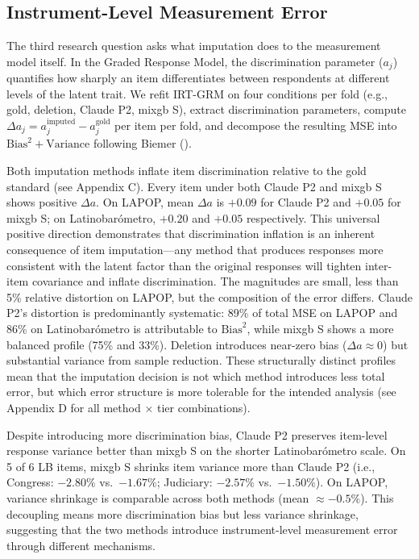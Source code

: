 \documentclass[
  man,
  floatsintext,
  longtable,
  nolmodern,
  notxfonts,
  notimes,
  colorlinks=true,linkcolor=blue,citecolor=blue,urlcolor=blue]{apa7}
\begin{document}
\subsection{Instrument-Level Measurement
Error}\label{instrument-level-measurement-error}

The third research question asks what imputation does to the measurement
model itself. In the Graded Response Model, the discrimination parameter
(\(a_j\)) quantifies how sharply an item differentiates between
respondents at different levels of the latent trait. We refit IRT-GRM on
four conditions per fold (e.g., gold, deletion, Claude P2, mixgb S),
extract discrimination parameters, compute
\(\Delta a_j = a_j^{\text{imputed}} - a_j^{\text{gold}}\) per item per
fold, and decompose the resulting MSE into
\(\text{Bias}^2 + \text{Variance}\) following Biemer
().

Both imputation methods inflate item discrimination relative to the gold
standard (see Appendix C). Every item under both Claude P2 and mixgb S
shows positive \(\Delta a\). On LAPOP, mean \(\Delta a\) is \(+0.09\)
for Claude P2 and \(+0.05\) for mixgb S; on Latinobarómetro, \(+0.20\)
and \(+0.05\) respectively. This universal positive direction
demonstrates that discrimination inflation is an inherent consequence of
item imputation---any method that produces responses more consistent
with the latent factor than the original responses will tighten
inter-item covariance and inflate discrimination. The magnitudes are
small, less than 5\% relative distortion on LAPOP, but the composition
of the error differs. Claude P2's distortion is predominantly
systematic: 89\% of total MSE on LAPOP and 86\% on Latinobarómetro is
attributable to \(\text{Bias}^2\), while mixgb S shows a more balanced
profile (75\% and 33\%). Deletion introduces near-zero bias
(\(\Delta a \approx 0\)) but substantial variance from sample reduction.
These structurally distinct profiles mean that the imputation decision
is not which method introduces less total error, but which error
structure is more tolerable for the intended analysis (see Appendix D
for all method \(\times\) tier combinations).

Despite introducing more discrimination bias, Claude P2 preserves
item-level response variance better than mixgb S on the shorter
Latinobarómetro scale. On 5 of 6 LB items, mixgb S shrinks item variance
more than Claude P2 (i.e., Congress: \(-2.80\%\) vs.~\(-1.67\%\);
Judiciary: \(-2.57\%\) vs.~\(-1.50\%\)). On LAPOP, variance shrinkage is
comparable across both methods (mean \(\approx -0.5\%\)). This
decoupling means more discrimination bias but less variance shrinkage,
suggesting that the two methods introduce instrument-level measurement
error through different mechanisms.
\end{document}

